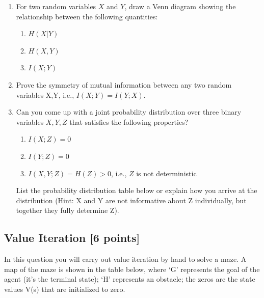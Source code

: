 \documentclass[11pt]{article}
\numberwithin{equation}{section} %
\numberwithin{figure}{section} %
\numberwithin{table}{section} %
\newcommand{\points}[1]{{\bf [#1 points]}}
\begin{document}
\begin{enumerate}
    \item[4] [3 points] For two random variables $X$ and $Y$, draw a Venn diagram showing the relationship between the following quantities:
    \begin{enumerate}
        \item $H(X|Y)$
        \item $H(X, Y)$ 
        \item $I(X;Y)$ 
    \end{enumerate}
    \begin{tcolorbox}[fit,height=5cm, width=\linewidth, blank, borderline={1pt}{1pt}]
    \end{tcolorbox}
    
    
    \item[5] [2 points] Prove the symmetry of mutual information between any two random variables X,Y, i.e., $I(X;Y) = I(Y;X)$.\\
    \begin{tcolorbox}[fit,height=5cm, width=\linewidth, blank, borderline={1pt}{1pt}]
    \end{tcolorbox}
    
    
    \item[6] [bonus, 2 points] Can you come up with a joint probability distribution over three binary variables $X, Y, Z$ that satisfies the following properties?
    \begin{enumerate}
        \item $I(X;Z)=0$
        \item $I(Y;Z)=0$
        \item $I(X,Y;Z) = H(Z) > 0$, i.e., $Z$ is not deterministic
    \end{enumerate}
    List the probability distribution table below or explain how you arrive at the distribution (Hint: X and Y are not informative about Z individually, but together they fully determine Z).
    \begin{tcolorbox}[fit,height=3cm, width=\linewidth, blank, borderline={1pt}{1pt}]
    \end{tcolorbox}

\end{enumerate}



\clearpage
\subsection{Value Iteration \points{6}}

In this question you will carry out value iteration by hand to solve a maze. A map of the maze is shown in the table below, where `G' represents the goal of the agent (it's the terminal state); `H' represents an obstacle; the zeros are the state values V(s) that are initialized to zero.
\end{document}
